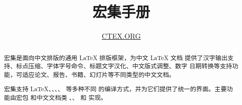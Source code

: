 \documentclass{ctxdoc}
\title{\bfseries \CTeX{} 宏集手册}
\author{\href{http://www.ctex.org}{CTEX.ORG}}
\date{\filedate\qquad\fileversion}
\begin{document}
\maketitle

\begin{abstract}
\CTeX{} 宏集是面向中文排版的通用 \LaTeX{} 排版框架，为中文 \LaTeX{} 文档
提供了汉字输出支持、标点压缩、字体字号命令、标题文字汉化、中文版式调整、数字
日期转换等支持功能，可适应论文、报告、书籍、幻灯片等不同类型的中文文档。

\CTeX{} 宏集支持 \LaTeX、\pdfLaTeX、\XeLaTeX、\LuaLaTeX、\upLaTeX{} 等多种不同
的编译方式，并为它们提供了统一的界面。主要功能由宏包  和中文文档类
、、 和  实现。
\end{abstract}

\tableofcontents

\clearpage
\setlength{\parskip}{0.8ex}
\end{document}
